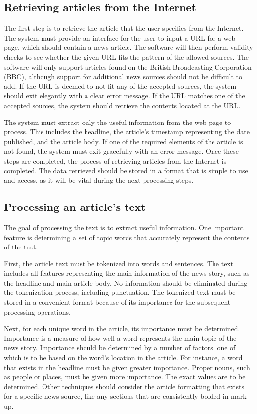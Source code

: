 \documentclass[11pt,titlepage]{report}
\begin{document}
\subsection{Retrieving articles from the Internet}
The first step is to retrieve the article that the user specifies from the Internet. The system must provide an interface for the user to input a URL for a web page, which should contain a news article. The software will then perform validity checks to see whether the given URL fits the pattern of the allowed sources. The software will only support articles found on the British Broadcasting Corporation (BBC), although support for additional news sources should not be difficult to add. If the URL is deemed to not fit any of the accepted sources, the system should exit elegantly with a clear error message. If the URL matches one of the accepted sources, the system should retrieve the contents located at the URL.  

The system must extract only the useful information from the web page to process. This includes the headline, the article's timestamp representing the date published, and the article body. If one of the required elements of the article is not found, the system must exit gracefully with an error message. Once these steps are completed, the process of retrieving articles from the Internet is completed. The data retrieved should be stored in a format that is simple to use and access, as it will be vital during the next processing steps.

\subsection{Processing an article's text}
The goal of processing the text is to extract useful information. One important feature is determining a set of topic words that accurately represent the contents of the text.

First, the article text must be tokenized into words and sentences. The text includes all features representing the main information of the news story, such as the headline and main article body. No information should be eliminated during the tokenization process, including punctuation. The tokenized text must be stored in a convenient format because of its importance for the subsequent processing operations. 

Next, for each unique word in the article, its importance must be determined. Importance is a measure of how well a word represents the main topic of the news story. Importance should be determined by a number of factors, one of which is to be based on the word's location in the article. For instance, a word that exists in the headline must be given greater importance. Proper nouns, such as people or places, must be given more importance. The exact values are to be determined. Other techniques should consider the article formatting that exists for a specific news source, like any sections that are consistently bolded in mark-up. 
\end{document}
